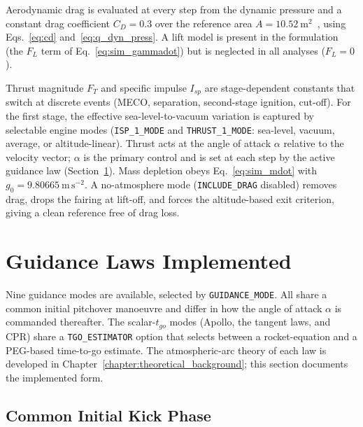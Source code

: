 Aerodynamic drag is evaluated at every step from the dynamic pressure and a
constant drag coefficient $C_D=0.3$ over the reference area
$A=10.52~\mathrm{m^{2}}$~\cite{NASA_Falcon9v12_Datasheet_2018}, using
Eqs.~\eqref{eq:cd} and~\eqref{eq:q_dyn_press}. A lift model is present in the
formulation (the $F_L$ term of Eq.~\eqref{eq:sim_gammadot}) but is neglected in
all analyses ($F_L=0$).

Thrust magnitude $F_T$ and specific impulse $I_{sp}$ are stage-dependent
constants that switch at discrete events (MECO, separation, second-stage
ignition, cut-off). For the first stage, the effective sea-level-to-vacuum
variation is captured by selectable engine modes (\texttt{ISP\_1\_MODE} and
\texttt{THRUST\_1\_MODE}: sea-level, vacuum, average, or altitude-linear). Thrust
acts at the angle of attack $\alpha$ relative to the velocity vector; $\alpha$ is
the primary control and is set at each step by the active guidance law
(Section~\ref{sec:guidance}). Mass depletion obeys Eq.~\eqref{eq:sim_mdot} with
$g_0=9.80665~\mathrm{m\,s^{-2}}$. A no-atmosphere mode (\texttt{INCLUDE\_DRAG}
disabled) removes drag, drops the fairing at lift-off, and forces the
altitude-based exit criterion, giving a clean reference free of drag loss.

\section{Guidance Laws Implemented}
\label{sec:guidance}

Nine guidance modes are available, selected by \texttt{GUIDANCE\_MODE}. All share
a common initial pitchover manoeuvre and differ in how the angle of attack
$\alpha$ is commanded thereafter. The scalar-$t_{go}$ modes (Apollo, the tangent
laws, and CPR) share a \texttt{TGO\_ESTIMATOR} option that selects between a
rocket-equation and a PEG-based time-to-go estimate. The atmospheric-arc theory
of each law is developed in Chapter~\ref{chapter:theoretical_background}; this section
documents the implemented form.

\subsection{Common Initial Kick Phase}
\label{ssec:kick_phase}

